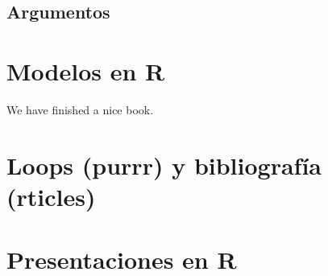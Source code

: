 \documentclass[]{book}
\begin{document}
\hypertarget{argumentos}{%
\section{Argumentos}\label{argumentos}}

\hypertarget{modelos}{%
\chapter{Modelos en R}\label{modelos}}

We have finished a nice book.

\hypertarget{loops}{%
\chapter{Loops (purrr) y bibliografía (rticles)}\label{loops}}

\hypertarget{presentacion}{%
\chapter{Presentaciones en R}\label{presentacion}}


\end{document}
